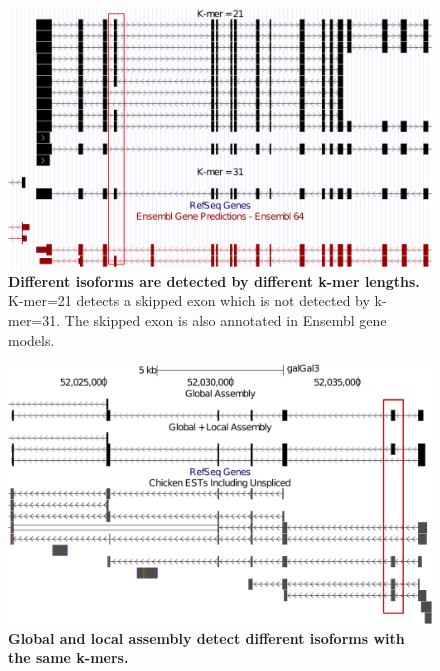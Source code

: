 \documentclass[10pt]{article}
\begin{document}
\begin{figure}[!ht]
\begin{center}
\includegraphics[width=5in]{kmers-variance.pdf}
\end{center}
\caption{
{\bf Different isoforms are detected by different k-mer lengths.}
K-mer=21 detects a skipped exon which is not detected by k-mer=31.
The skipped exon is also annotated in Ensembl gene models.
}
\label{kmer-variance}
\end{figure}

\begin{figure}[!ht]
\begin{center}
\includegraphics[width=5in]{global_vs_local.pdf}
\end{center}
\caption{
{\bf Global and local assembly detect different isoforms with the same k-mers.} 
}
\label{global_vs_local}
\end{figure}
\end{document}
